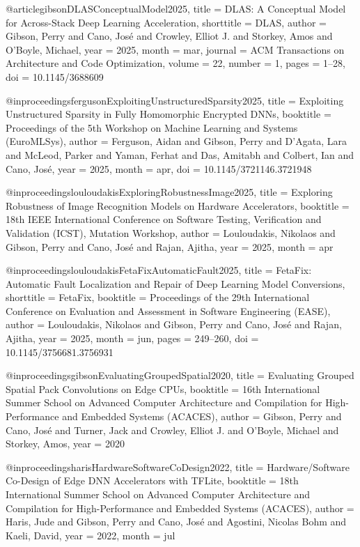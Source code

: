 @article{gibsonDLASConceptualModel2025,
  title = {{{DLAS}}: {{A Conceptual Model}} for {{Across-Stack Deep Learning Acceleration}}},
  shorttitle = {{{DLAS}}},
  author = {Gibson, Perry and Cano, Jos{\'e} and Crowley, Elliot J. and Storkey, Amos and O'Boyle, Michael},
  year = {2025},
  month = mar,
  journal = {ACM Transactions on Architecture and Code Optimization},
  volume = {22},
  number = {1},
  pages = {1--28},
  doi = {10.1145/3688609}
}

@inproceedings{fergusonExploitingUnstructuredSparsity2025,
  title = {Exploiting {{Unstructured Sparsity}} in {{Fully Homomorphic Encrypted DNNs}}},
  booktitle = {Proceedings of the 5th {{Workshop}} on {{Machine Learning}} and {{Systems}} ({{EuroMLSys}})},
  author = {Ferguson, Aidan and Gibson, Perry and D'Agata, Lara and McLeod, Parker and Yaman, Ferhat and Das, Amitabh and Colbert, Ian and Cano, Jos{\'e}},
  year = {2025},
  month = apr,
  doi = {10.1145/3721146.3721948}
}

@inproceedings{louloudakisExploringRobustnessImage2025,
  title = {Exploring {{Robustness}} of {{Image Recognition Models}} on {{Hardware Accelerators}}},
  booktitle = {18th {{IEEE International Conference}} on {{Software Testing}}, {{Verification}} and {{Validation}} ({{ICST}}), {{Mutation Workshop}}},
  author = {Louloudakis, Nikolaos and Gibson, Perry and Cano, Jos{\'e} and Rajan, Ajitha},
  year = {2025},
  month = apr
}

@inproceedings{louloudakisFetaFixAutomaticFault2025,
  title = {{{FetaFix}}: {{Automatic Fault Localization}} and {{Repair}} of {{Deep Learning Model Conversions}}},
  shorttitle = {{{FetaFix}}},
  booktitle = {Proceedings of the 29th {{International Conference}} on {{Evaluation}} and {{Assessment}} in {{Software Engineering}} ({{EASE}})},
  author = {Louloudakis, Nikolaos and Gibson, Perry and Cano, Jos{\'e} and Rajan, Ajitha},
  year = {2025},
  month = jun,
  pages = {249--260},
  doi = {10.1145/3756681.3756931}
}

@inproceedings{gibsonEvaluatingGroupedSpatial2020,
  title = {Evaluating {{Grouped Spatial Pack Convolutions}} on {{Edge CPUs}}},
  booktitle = {16th {{International Summer School}} on {{Advanced Computer Architecture}} and {{Compilation}} for {{High-Performance}} and {{Embedded Systems}} ({{ACACES}})},
  author = {Gibson, Perry and Cano, Jos{\'e} and Turner, Jack and Crowley, Elliot J. and O'Boyle, Michael and Storkey, Amos},
  year = {2020}
}

@inproceedings{harisHardwareSoftwareCoDesign2022,
  title = {Hardware/{{Software Co-Design}} of {{Edge DNN Accelerators}} with {{TFLite}}},
  booktitle = {18th {{International Summer School}} on {{Advanced Computer Architecture}} and {{Compilation}} for {{High-Performance}} and {{Embedded Systems}} ({{ACACES}})},
  author = {Haris, Jude and Gibson, Perry and Cano, Jos{\'e} and Agostini, Nicolas Bohm and Kaeli, David},
  year = {2022},
  month = jul
}

